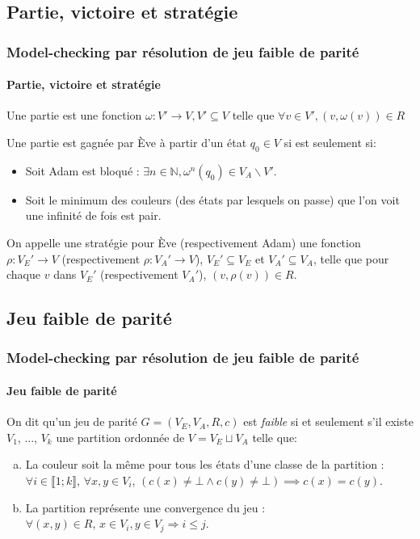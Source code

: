 \documentclass[11pt]{beamer}
\begin{document}
\subsection{Partie, victoire et stratégie}
\begin{frame}
    \frametitle{Model-checking par résolution de jeu faible de parité}
    \framesubtitle{Partie, victoire et stratégie}

    Une partie est une fonction $\omega : V' \to V, V' \subseteq V$ telle que $\forall v \in V', (v,\omega(v)) \in R$

    \pause
    \bigskip

    Une partie est gagnée par Ève à partir d'un état $q_0 \in V$ si est seulement si:
    \begin{itemize}
    \item Soit Adam est bloqué : $\exists n \in \mathbb{N}, \omega^n (q_0) \in V_A\backslash V'$.
    \item Soit le minimum des couleurs (des états par lesquels on passe) que l'on voit une infinité de fois est pair.
    \end{itemize}

    \pause
    \bigskip

    On appelle une stratégie pour Ève (respectivement Adam) une fonction $\rho : V_E' \to V$ (respectivement $\rho : V_A' \to V$), $V_E' \subseteq V_E$ et $V_A' \subseteq V_A$, telle que pour chaque $v$ dans $V_E'$ (respectivement $V_A'$), $(v, \rho(v)) \in R$.
\end{frame}

\subsection{Jeu faible de parité}
\begin{frame}
    \frametitle{Model-checking par résolution de jeu faible de parité}
    \framesubtitle{Jeu faible de parité}

    On dit qu'un jeu de parité $G = (V_E,V_A,R,c)$ est \emph{faible}  si et seulement s'il existe $V_1$, ..., $V_k$ une partition ordonnée de $V = V_E \sqcup V_A$ telle que:
    \begin{enumerate}[a)]
    \item La couleur soit la même pour tous les états d'une classe de la partition : $\forall i \in \llbracket 1 ; k \rrbracket$, $\forall x, y \in V_i$, $(c(x) \neq \bot \land c(y) \neq \bot)  \implies c(x) = c(y)$.
    \item La partition représente une convergence du jeu :\\
    $\forall (x, y) \in R$, $x\in V_i, y \in V_j \Rightarrow i \leq j$.
    \end{enumerate}
\end{frame}
\end{document}
